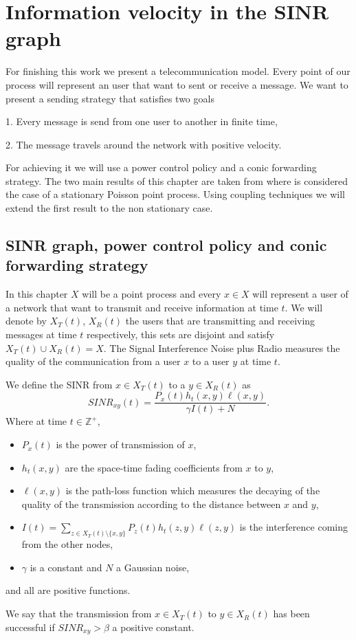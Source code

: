 \chapter{Information velocity in the SINR graph}
For finishing this work we present a telecommunication model. Every point of our process will represent an user that want to sent or receive a message. We want to present a sending strategy that satisfies two goals

1. Every message is send  from one user to another in finite time,

2. The message travels around the network with positive velocity.

For achieving it we will use a power control policy and a conic forwarding strategy. The two main results of this chapter are taken from \cite{Iye} where is considered the case of a stationary Poisson point process. Using coupling techniques we will extend the first result to the non stationary case.

\section{SINR graph, power control policy and conic forwarding strategy}

In this chapter $X$ will be a point process and every $x\in X$ will represent a user of a network that want to transmit and receive information at time $t$. We will denote by $X_{T}(t)$, $X_R(t)$ the users that are transmitting and receiving messages at time $t$ respectively, this sets are disjoint and satisfy $X_{T}(t)\cup X_R(t)=X$. The Signal Interference Noise plus Radio measures the quality of the communication from a user $x$ to a user $y$ at time $t$.
\begin{defn} We define the SINR from $x\in X_T (t)$ to a $y\in X_R (t)$ as
$$SINR_{xy} (t)=\frac{P_x(t)h_t(x,y)\ell(x,y)}{\gamma I(t)+N}. $$
Where at time $t\in\mathbb{Z}^+$,
\begin{itemize}
 \item $P_x(t)$ is the power of transmission  of $x$,
 \item $h_t(x,y)$ are the space-time fading coefficients from $x$ to $y$,
 \item $\ell(x,y)$ is the path-loss function which measures the decaying of the quality of the transmission according to the distance between $x$ and $y$,
 \item $I(t)=\sum_{z\in X_T(t)\setminus\lbrace x,y \rbrace}P_z(t)h_t(z,y)\ell(z,y)$ is the interference coming from the other nodes,
 \item $\gamma$ is a constant and $N$ a Gaussian noise,
\end{itemize}
 and all are positive functions.

We say that the transmission from $x\in X_T (t)$ to $y\in X_R (t)$ has been successful if $SINR_{xy}>\beta$ a positive constant. 
\end{defn}

